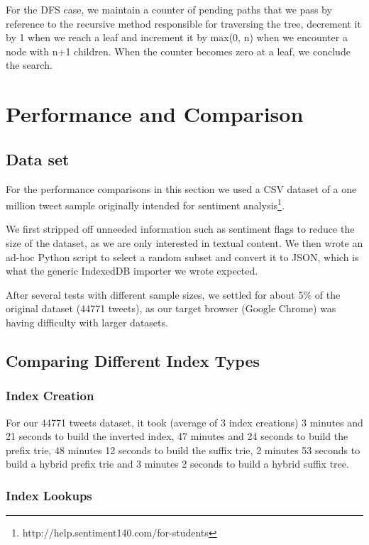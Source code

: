 \documentclass{vldb}
\begin{document}
For the DFS case, we maintain a counter of pending paths that we pass by reference to the recursive method responsible for traversing the tree, decrement it by 1 when we reach a leaf and increment it by max(0, n) when we encounter a node with n+1 children. When the counter becomes zero at a leaf, we conclude the search.

\section{Performance and Comparison}

\subsection{Data set}

For the performance comparisons in this section we used a CSV dataset of a one million tweet sample originally intended for sentiment analysis\footnote{http://help.sentiment140.com/for-students}.

We first stripped off unneeded information such as sentiment flags to reduce the size of the dataset, as we are only interested in textual content. We then wrote an ad-hoc Python script to select a random subset and convert it to JSON, which is what the generic IndexedDB importer we wrote expected.

After several tests with different sample sizes, we settled for about 5\% of the original dataset (44771 tweets), as our target browser (Google Chrome) was having difficulty with larger datasets.

\subsection{Comparing Different Index Types}

\subsubsection{Index Creation}

For our 44771 tweets dataset, it took (average of 3 index creations) 3 minutes and 21 seconds to build the inverted index, 47 minutes and 24 seconds to build the prefix trie, 48 minutes 12 seconds to build the suffix trie, 2 minutes 53 seconds to build a hybrid prefix trie and 3 minutes 2 seconds to build a hybrid suffix tree. 

\subsubsection{Index Lookups}
\end{document}
